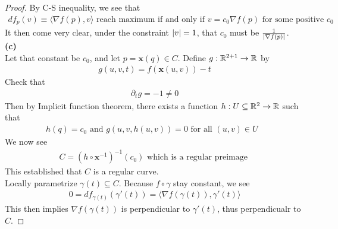 \documentclass{report}
\begin{document}
\begin{proof}
By C-S inequality, we see that 
\begin{align*}
 df_p(v)\equiv \langle \nabla f(p),v\rangle \text{ reach maximum if and only if  $v=c_0\nabla f(p)$  for some positive $c_0$ }
\end{align*}
It then come very clear, under the constraint $\left|v\right|=1$, that $c_0$ must be  $\frac{1}{\left|\nabla f(p)\right|}$.\\

\textbf{(c)}\\

Let that constant be $c_0$, and let $p=\textbf{x}(q) \in C$. Define $g:\mathbb{R}^{2+1} \rightarrow \mathbb{R}$ by 
\begin{align*}
g(u,v,t)=f(\textbf{x}(u,v))-t
\end{align*}
Check that 
\begin{align*}
\partial_t g=-1 \neq 0
\end{align*}
Then by Implicit function theorem, there exists a function $h:U\subseteq \mathbb{R}^2 \rightarrow \mathbb{R}$ such that 
\begin{align*}
h(q)=c_0 \text{ and }g(u,v,h(u,v))=0\text{ for all $(u,v)\in U$ }
\end{align*}
We now see 
\begin{align*}
C=(h\circ \textbf{x}^{-1})^{-1}(c_0)\text{ which is a regular preimage }
\end{align*}
This established that $C$ is a regular curve.\\

Locally parametrize $\gamma (t)\subseteq C$. Because $f\circ \gamma $ stay constant, we see
\begin{align*}
0=df_{\gamma (t)}(\gamma '(t))=\langle \nabla f(\gamma (t)),\gamma '(t)\rangle 
\end{align*}
This then implies $\nabla f(\gamma (t))$ is perpendicular to $\gamma '(t)$, thus perpendicualr to $C$. 
\end{proof}
\end{document}
